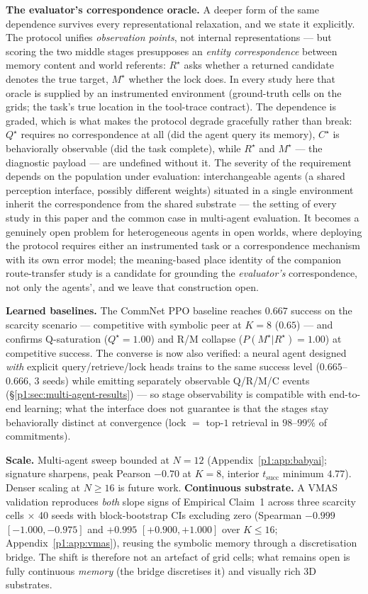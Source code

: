 \documentclass{article}
\begin{document}
\textbf{The evaluator's correspondence oracle.} A deeper form of the
same dependence survives every representational relaxation, and we
state it explicitly. The protocol unifies \emph{observation points},
not internal representations --- but scoring the two middle stages
presupposes an \emph{entity correspondence} between memory content and
world referents: $R^\star$ asks whether a returned candidate denotes
the true target, $M^\star$ whether the lock does. In every study here
that oracle is supplied by an instrumented environment (ground-truth
cells on the grids; the task's true location in the tool-trace
contract). The dependence is graded, which is what makes the protocol
degrade gracefully rather than break: $Q^\star$ requires no
correspondence at all (did the agent query its memory), $C^\star$ is
behaviorally observable (did the task complete), while $R^\star$ and
$M^\star$ --- the diagnostic payload --- are undefined
without it. The severity of the requirement depends on the population
under evaluation: interchangeable agents (a shared perception
interface, possibly different weights) situated in a single
environment inherit the correspondence from the shared substrate ---
the setting of every study in this paper and the common case in
multi-agent evaluation. It becomes a genuinely open problem for
heterogeneous agents in open worlds, where deploying the protocol
requires either an instrumented task or a correspondence mechanism
with its own error model; the meaning-based place identity of the companion route-transfer study \citep{songlines2}
is a candidate for grounding the \emph{evaluator's} correspondence,
not only the agents', and we leave that construction open.

\textbf{Learned baselines.} The CommNet PPO baseline reaches $0.667$ success on the scarcity scenario --- competitive with symbolic peer at $K{=}8$ ($0.65$) --- and confirms Q-saturation ($Q^\star{=}1.00$) and R/M collapse ($P(M^\star|R^\star){=}1.00$) at competitive success. The converse is now also verified: a neural agent designed \emph{with} explicit query/retrieve/lock heads trains to the same success level ($0.665$--$0.666$, $3$ seeds) while emitting separately observable Q/R/M/C events (\S\ref{p1:sec:multi-agent-results}) --- so stage observability is compatible with end-to-end learning; what the interface does not guarantee is that the stages stay behaviorally distinct at convergence (lock $=$ top-$1$ retrieval in $98$--$99\%$ of commitments).

\textbf{Scale.} Multi-agent sweep bounded at $N{=}12$ (Appendix~\ref{p1:app:babyai}; signature sharpens, peak Pearson $-0.70$ at $K{=}8$, interior $t_{\mathrm{succ}}$ minimum $4.77$). Denser scaling at $N{\ge}16$ is future work.
\textbf{Continuous substrate.} A VMAS~\citep{bettini2022vmas} validation reproduces \emph{both} slope signs of Empirical Claim~1 across three scarcity cells $\times$ 40 seeds with block-bootstrap CIs excluding zero (Spearman $-0.999$ $[-1.000,-0.975]$ and $+0.995$ $[+0.900,+1.000]$ over $K{\le}16$; Appendix~\ref{p1:app:vmas}), reusing the symbolic memory through a discretisation bridge. The shift is therefore not an artefact of grid cells; what remains open is fully continuous \emph{memory} (the bridge discretises it) and visually rich 3D substrates.
\end{document}
